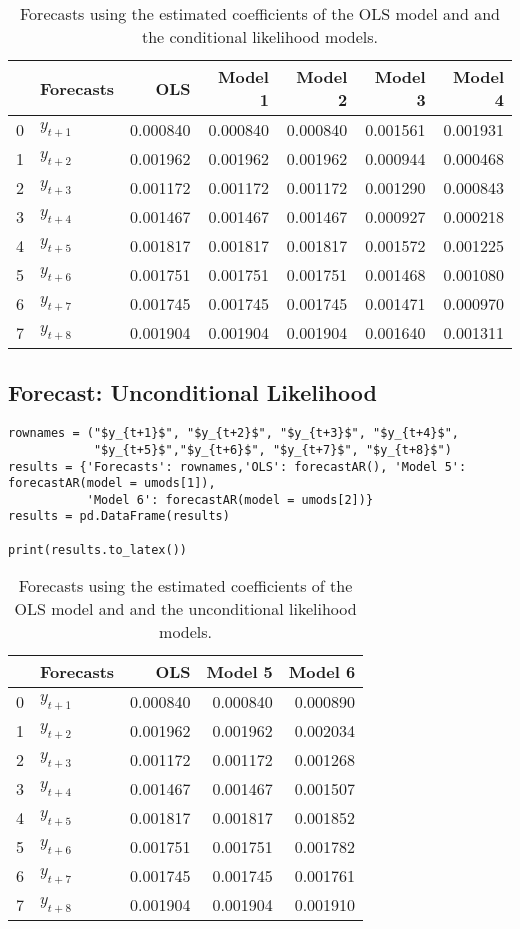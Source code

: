 \documentclass{article}
\begin{document}
\begin{table}[h]
\centering
\begin{tabular}{llrrrrr}
\toprule
 & Forecasts & OLS & Model 1 & Model 2 & Model 3 & Model 4 \\
\midrule
0 & $y_{t+1}$ & 0.000840 & 0.000840 & 0.000840 & 0.001561 & 0.001931 \\
1 & $y_{t+2}$ & 0.001962 & 0.001962 & 0.001962 & 0.000944 & 0.000468 \\
2 & $y_{t+3}$ & 0.001172 & 0.001172 & 0.001172 & 0.001290 & 0.000843 \\
3 & $y_{t+4}$ & 0.001467 & 0.001467 & 0.001467 & 0.000927 & 0.000218 \\
4 & $y_{t+5}$ & 0.001817 & 0.001817 & 0.001817 & 0.001572 & 0.001225 \\
5 & $y_{t+6}$ & 0.001751 & 0.001751 & 0.001751 & 0.001468 & 0.001080 \\
6 & $y_{t+7}$ & 0.001745 & 0.001745 & 0.001745 & 0.001471 & 0.000970 \\
7 & $y_{t+8}$ & 0.001904 & 0.001904 & 0.001904 & 0.001640 & 0.001311 \\
\bottomrule
\end{tabular}
\caption{Forecasts using the estimated coefficients of the OLS model and and the conditional likelihood models.}
\end{table}

\subsection{Forecast: Unconditional Likelihood}
\begin{verbatim}
rownames = ("$y_{t+1}$", "$y_{t+2}$", "$y_{t+3}$", "$y_{t+4}$",
            "$y_{t+5}$","$y_{t+6}$", "$y_{t+7}$", "$y_{t+8}$")
results = {'Forecasts': rownames,'OLS': forecastAR(), 'Model 5': forecastAR(model = umods[1]),
           'Model 6': forecastAR(model = umods[2])}
results = pd.DataFrame(results)

print(results.to_latex())
\end{verbatim}
\begin{table}[h]
\centering
\begin{tabular}{llrrr}
\toprule
 & Forecasts & OLS & Model 5 & Model 6 \\
\midrule
0 & $y_{t+1}$ & 0.000840 & 0.000840 & 0.000890 \\
1 & $y_{t+2}$ & 0.001962 & 0.001962 & 0.002034 \\
2 & $y_{t+3}$ & 0.001172 & 0.001172 & 0.001268 \\
3 & $y_{t+4}$ & 0.001467 & 0.001467 & 0.001507 \\
4 & $y_{t+5}$ & 0.001817 & 0.001817 & 0.001852 \\
5 & $y_{t+6}$ & 0.001751 & 0.001751 & 0.001782 \\
6 & $y_{t+7}$ & 0.001745 & 0.001745 & 0.001761 \\
7 & $y_{t+8}$ & 0.001904 & 0.001904 & 0.001910 \\
\bottomrule
\end{tabular}
\caption{Forecasts using the estimated coefficients of the OLS model and and the unconditional likelihood models.}
\end{table}
\end{document}

